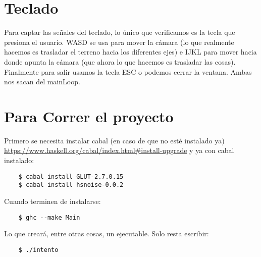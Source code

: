 \documentclass{article}
\begin{document}
\section{Teclado}

Para captar las señales del teclado, lo único que verificamos es la tecla que presiona el usuario. WASD se usa para mover la cámara (lo que realmente hacemos es trasladar el terreno hacia los diferentes ejes) e IJKL para mover hacia donde apunta la cámara (que ahora lo que hacemos es trasladar las cosas). Finalmente para salir usamos la tecla ESC o podemos cerrar la ventana. Ambas nos sacan del mainLoop.

\section{Para Correr el proyecto}

Primero se necesita instalar cabal (en caso de que no esté instalado ya) \url{https://www.haskell.org/cabal/index.html#install-upgrade} y ya con cabal instalado:

\begin{verbatim}
    $ cabal install GLUT-2.7.0.15
    $ cabal install hsnoise-0.0.2
\end{verbatim}
Cuando terminen de instalarse:

\begin{verbatim}
    $ ghc --make Main
\end{verbatim}

Lo que creará, entre otras cosas, un ejecutable. Solo resta escribir:

\begin{verbatim}
    $ ./intento
\end{verbatim}
\end{document}
